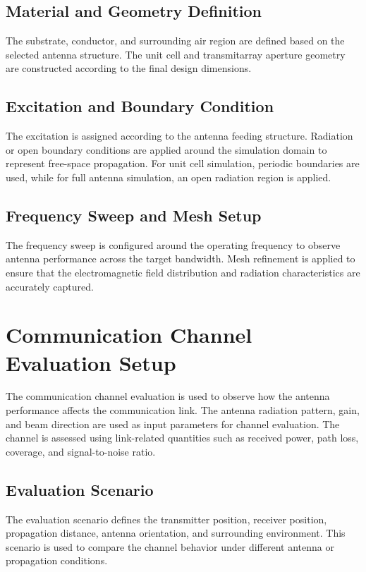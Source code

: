 \subsection{Material and Geometry Definition}
The substrate, conductor, and surrounding air region are defined based on the selected antenna structure. The unit cell and transmitarray aperture geometry are constructed according to the final design dimensions.

\subsection{Excitation and Boundary Condition}
The excitation is assigned according to the antenna feeding structure. Radiation or open boundary conditions are applied around the simulation domain to represent free-space propagation. For unit cell simulation, periodic boundaries are used, while for full antenna simulation, an open radiation region is applied.

\subsection{Frequency Sweep and Mesh Setup}
The frequency sweep is configured around the operating frequency to observe antenna performance across the target bandwidth. Mesh refinement is applied to ensure that the electromagnetic field distribution and radiation characteristics are accurately captured.

\section{Communication Channel Evaluation Setup}
The communication channel evaluation is used to observe how the antenna performance affects the communication link. The antenna radiation pattern, gain, and beam direction are used as input parameters for channel evaluation. The channel is assessed using link-related quantities such as received power, path loss, coverage, and signal-to-noise ratio.

\subsection{Evaluation Scenario}
The evaluation scenario defines the transmitter position, receiver position, propagation distance, antenna orientation, and surrounding environment. This scenario is used to compare the channel behavior under different antenna or propagation conditions.

